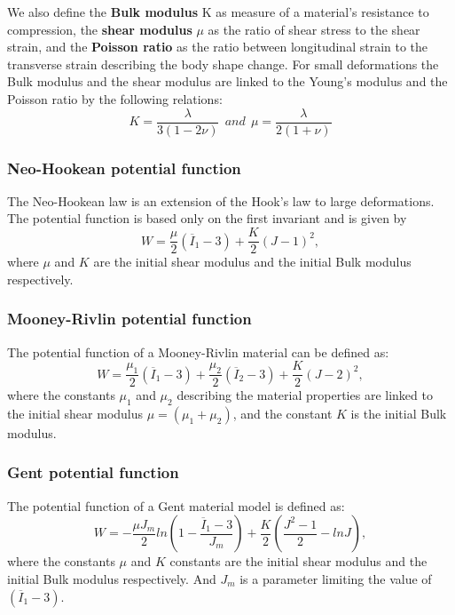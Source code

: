 We also define the \textbf{Bulk modulus} K  as measure of a material's resistance to compression, the \textbf{shear modulus} $\mu$ as the ratio of shear stress to the shear strain, and the \textbf{Poisson ratio}  as the ratio between longitudinal strain to the transverse strain describing the body shape change. For small deformations the Bulk modulus and the shear modulus are linked to the Young's modulus and the Poisson ratio by the following relations:
 \begin{equation} 
  K = \frac{\lambda}{3(1-2\nu)} \ \ and \ \ \mu = \frac{\lambda}{2(1+\nu)}
\end{equation}
  
\subsubsection*{Neo-Hookean potential function}
The Neo-Hookean \citep{treloar_elasticity_1943} law is an extension of the Hook's law to large deformations. The potential function is based only on the first invariant and is given by 
\begin{equation}
\label{eq:Neo-Hookmodel}
W =\frac{\mu}{2} (\overline{I}_1-3) + \frac{K}{2}(J-1)^2,
\end{equation}
where $\mu$ and $K$ are the initial shear modulus and the initial Bulk modulus respectively. 
\subsubsection*{Mooney-Rivlin potential function}
The potential function of a Mooney-Rivlin \citep{rivlin_large_1951} material can be defined as:
\begin{equation}
\label{eq:mooneyRivlingmodel}
W=\frac{\mu_1}{2}(\overline{I}_1-3)+\frac{\mu_2}{2}(\overline{I}_2-3)+\frac{K}{2}(J-2)^2,
\end{equation}
where the constants $\mu_1$ and $\mu_2$ describing the material properties are linked to the initial shear modulus $\mu = (\mu_1+\mu_2)$, and the constant $K$ is the initial Bulk modulus. 

\subsubsection*{Gent potential function}
The potential function of a Gent \citep{gent_forms_1958} material model is defined as:
\begin{equation}
\label{gentmodel}
W=-\frac{\mu J_m}{2}ln\left(1-\frac{\overline{I}_1-3}{J_m}\right)+\frac{K}{2}\left(\frac{J^2-1}{2}-lnJ\right),
\end{equation}
 where the constants $\mu$ and $K$ constants are the initial shear modulus and the initial Bulk modulus respectively. And $J_m$ is a parameter limiting the value of $(\overline{I}_1-3).$
